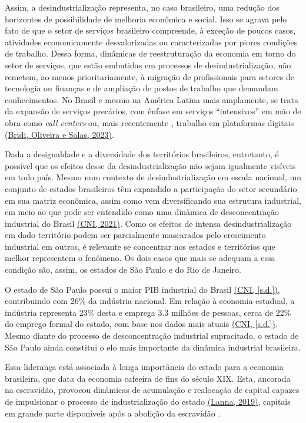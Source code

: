Assim, a desindustrialização representa, no caso brasileiro, uma redução
dos horizontes de possibilidade de melhoria econômica e social. Isso se
agrava pelo fato de que o setor de serviços brasileiro compreende, à
exceção de poucos casos, atividades economicamente desvalorizadas ou
caracterizadas por piores condições de trabalho. Dessa forma, dinâmicas
de reestruturação da economia em torno do setor de serviços, que estão
embutidas em processos de desindustrialização, não remetem, ao menos
prioritariamente, à migração de profissionais para setores de tecnologia
ou finanças e de ampliação de postos de trabalho que demandam
conhecimentos. No Brasil e mesmo na América Latina mais amplamente, se
trata da expansão de serviços precários, com ênfase em serviços
``intensivos'' em mão de obra como \emph{call centers} ou, mais
recentemente , trabalho em plataformas digitais
\href{https://www.zotero.org/google-docs/?lOg0a8}{(Bridi, Oliveira e
Salas, 2023)}.

Dada a desigualdade e a diversidade dos territórios brasileiros,
entretanto, é possível que os efeitos desse da desindustrialização não
sejam igualmente visíveis em todo país. Mesmo num contexto de
desindustrialização em escala nacional, um conjunto de estados
brasileiros têm expandido a participação do setor secundário em sua
matriz econômica, assim como vem diversificando sua estrutura
industrial, em meio ao que pode ser entendido como uma dinâmica de
desconcentração industrial do Brasil
\href{https://www.zotero.org/google-docs/?mO9EhC}{(CNI, 2021)}. Como os
efeitos de intensa desindustrialização em dado território podem ser
parcialmente mascarados pelo crescimento industrial em outros, é
relevante se concentrar nos estados e territórios que melhor representem
o fenômeno. Os dois casos que mais se adequam a essa condição são,
assim, os estados de São Paulo e do Rio de Janeiro.

O estado de São Paulo possui o maior PIB industrial do Brasil
\href{https://www.zotero.org/google-docs/?Up7fFY}{(CNI, {[}s.d.{]})},
contribuindo com 26\% da indústria nacional. Em relação à economia
estadual, a indústria representa 23\% desta e emprega 3.3 milhões de
pessoas, cerca de 22\% do emprego formal do estado, com base nos dados
mais atuais \href{https://www.zotero.org/google-docs/?NASjAt}{(CNI,
{[}s.d.{]})}. Mesmo diante do processo de desconcentração industrial
supracitado, o estado de São Paulo ainda constitui o elo mais importante
da dinâmica industrial brasileira.

Essa liderança está associada à longa importância do estado para a
economia brasileira, que data da economia cafeeira de fins do século
XIX. Esta, ancorada na escravidão, provocou dinâmicas de acumulação e
realocação de capital capazes de impulsionar o processo de
industrialização do estado
\href{https://www.zotero.org/google-docs/?dqEUDA}{(Lanna, 2019)},
capitais em grande parte disponíveis após a abolição da escravidão .

